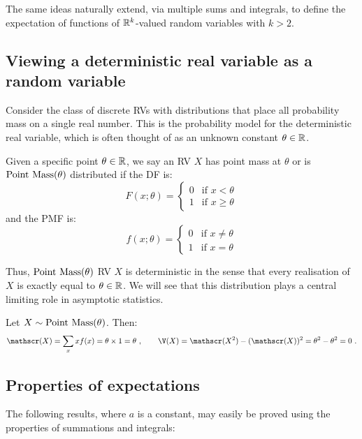 The same ideas naturally extend, via multiple sums and integrals, to define the expectation of functions of $\mathbb{R}^k$-valued random variables with $k>2$.


\subsection*{Viewing a deterministic real variable as a random variable}

Consider the class of discrete RVs with distributions that place all probability mass on a single real number.  
This is the probability model for the deterministic real variable, which is often thought of as an unknown constant $\theta \in \mathbb{R}$.
\begin{model}[$\pointmass(\theta)$]
Given a specific point $\theta \in \mathbb{R}$, we say an RV $X$ has point mass at $\theta$ or is $\pointmass(\theta)$ distributed if the DF is:
\begin{equation}\label{E:PointMasscdf}
F(x;\theta) =
\begin{cases}
0 & \text{if $x < \theta$} \\
1 & \text{if $x \geq \theta$}
\end{cases}
\end{equation}
and the PMF is:
\begin{equation}
f(x;\theta) =
\begin{cases}
0 & \text{if  $x \neq \theta$} \\
1 & \text{if $x = \theta$}
\end{cases}
\end{equation}
\end{model}
Thus, $\pointmass(\theta)$ RV $X$ is deterministic in the sense that every realisation of $X$ is exactly equal to $\theta \in \mathbb{R}$.  We will see that this distribution plays a central limiting role in asymptotic statistics.

\begin{example}
Let $X \sim \mbox{{\rm Point~Mass}}(\theta)$.  Then:
\[
\E(X) = \sum_{x} x f(x) = \theta \times 1 = \theta \ , \qquad
\V(X) = \E(X^2) - (\E(X))^2 = \theta^2 - \theta^2 = 0 \ .
\]
\end{example}

\subsection{Properties of expectations}\label{S:PropOfEs}
The following results, where $a$ is a  constant, may easily be
proved using the properties of summations and integrals:

